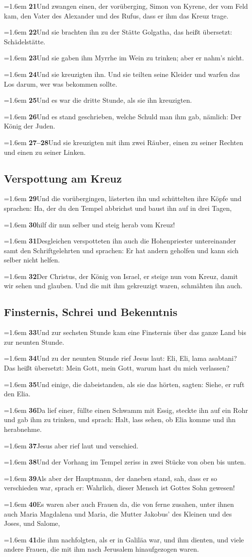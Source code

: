 \documentclass[12pt,a4paper]{article}
\newcommand{\vers}[2]{%
  \par\hangindent=1.6em\hangafter=1
  \textbf{#1}\enspace #2\par}
\begin{document}
\vers{21}{Und zwangen einen, der vorüberging, Simon von Kyrene, der vom Feld kam, den Vater des Alexander und des Rufus, dass er ihm das Kreuz trage.}
\vers{22}{Und sie brachten ihn zu der Stätte Golgatha, das heißt übersetzt: Schädelstätte.}
\vers{23}{Und sie gaben ihm Myrrhe im Wein zu trinken; aber er nahm's nicht.}
\vers{24}{Und sie kreuzigten ihn. Und sie teilten seine Kleider und warfen das Los darum, wer was bekommen sollte.}
\vers{25}{Und es war die dritte Stunde, als sie ihn kreuzigten.}
\vers{26}{Und es stand geschrieben, welche Schuld man ihm gab, nämlich: Der König der Juden.}
\vers{27--28}{Und sie kreuzigten mit ihm zwei Räuber, einen zu seiner Rechten und einen zu seiner Linken.}

\newpage

\subsection*{Verspottung am Kreuz}

\vers{29}{Und die vorübergingen, lästerten ihn und schüttelten ihre Köpfe und sprachen: Ha, der du den Tempel abbrichst und baust ihn auf in drei Tagen,}
\vers{30}{hilf dir nun selber und steig herab vom Kreuz!}
\vers{31}{Desgleichen verspotteten ihn auch die Hohenpriester untereinander samt den Schriftgelehrten und sprachen: Er hat andern geholfen und kann sich selber nicht helfen.}
\vers{32}{Der Christus, der König von Israel, er steige nun vom Kreuz, damit wir sehen und glauben. Und die mit ihm gekreuzigt waren, schmähten ihn auch.}

\subsection*{Finsternis, Schrei und Bekenntnis}

\vers{33}{Und zur sechsten Stunde kam eine Finsternis über das ganze Land bis zur neunten Stunde.}
\vers{34}{Und zu der neunten Stunde rief Jesus laut: Eli, Eli, lama asabtani? Das heißt übersetzt: Mein Gott, mein Gott, warum hast du mich verlassen?}
\vers{35}{Und einige, die dabeistanden, als sie das hörten, sagten: Siehe, er ruft den Elia.}
\vers{36}{Da lief einer, füllte einen Schwamm mit Essig, steckte ihn auf ein Rohr und gab ihm zu trinken, und sprach: Halt, lass sehen, ob Elia komme und ihn herabnehme.}
\vers{37}{Jesus aber rief laut und verschied.}
\vers{38}{Und der Vorhang im Tempel zeriss in zwei Stücke von oben bis unten.}
\vers{39}{Als aber der Hauptmann, der daneben stand, sah, dass er so verschieden war, sprach er: Wahrlich, dieser Mensch ist Gottes Sohn gewesen!}
\vers{40}{Es waren aber auch Frauen da, die von ferne zusahen, unter ihnen auch Maria Magdalena und Maria, die Mutter Jakobus' des Kleinen und des Joses, und Salome,}
\vers{41}{die ihm nachfolgten, als er in Galiläa war, und ihm dienten, und viele andere Frauen, die mit ihm nach Jerusalem hinaufgezogen waren.}
\end{document}
